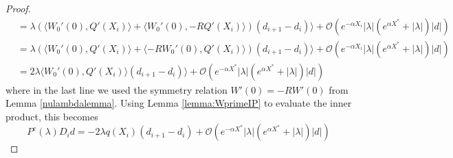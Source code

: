 \documentclass[thesis.tex]{subfiles}
\begin{document}
\begin{lemma}
\begin{proof}
\begin{align*}
&= \lambda ( \langle W_0'(0), Q'(X_i) \rangle + \langle W_0'(0), -R Q'(X_i)\rangle )(d_{i+1} - d_i ) \rangle + \mathcal{O}(e^{-\alpha X_i} |\lambda|(e^{\alpha X^*} + |\lambda|)|d|)\\
&= \lambda \left( \langle W_0'(0), Q'(X_i) \rangle + \langle -R W_0'(0), Q'(X_i)\rangle \right)(d_{i+1} - d_i ) \rangle + \mathcal{O}(e^{-\alpha X_i} |\lambda|(e^{\alpha X^*} + |\lambda|)|d|) \\
&= 2 \lambda \langle W_0'(0), Q'(X_i) \rangle (d_{i+1} - d_i ) \rangle + \mathcal{O}(e^{-\alpha X^*} |\lambda|(e^{\alpha X^*} + |\lambda|)|d|)
\end{align*}
where in the last line we used the symmetry relation $W'(0) = -R W'(0)$ from Lemma \ref{nulambdalemma}. Using Lemma \ref{lemma:WprimeIP} to evaluate the inner product, this becomes
\begin{equation}\label{PcDid2}
P^c(\lambda)D_i d = -2 \lambda q(X_i) (d_{i+1} - d_i ) + \mathcal{O}(e^{-\alpha X^*} |\lambda|(e^{\alpha X^*} + |\lambda|)|d|)
\end{equation}


\end{proof}
\end{lemma}
\end{document}
